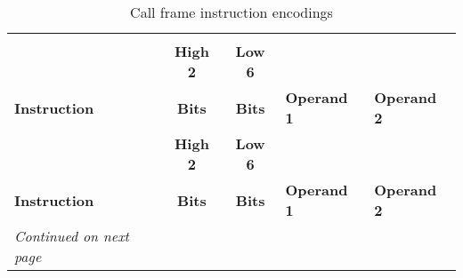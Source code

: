 \begin{centering}
\setlength{\extrarowheight}{0.1cm}
\begin{longtable}{l|c|c|l|l}
  \caption{Call frame instruction encodings} \label{tab:callframeinstructionencodings} \\
  \hline \\ &\bfseries High 2 &\bfseries Low 6 &  & \\
  \bfseries Instruction&\bfseries Bits &\bfseries Bits &\bfseries Operand 1 &\bfseries Operand 2\\ \hline
\endfirsthead
   & \bfseries High 2 &\bfseries Low 6 &  &\\
  \bfseries Instruction&\bfseries Bits &\bfseries Bits &\bfseries Operand 1 &\bfseries Operand 2\\ \hline
\endhead
  \hline \emph{Continued on next page}
\endfoot
  \hline
\endlastfoot


\end{longtable}
\end{centering}
